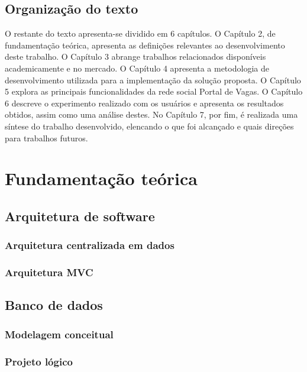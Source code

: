 \documentclass[cic,tc]{iiufrgs}
\begin{document}
\section{Organização do texto}
\label{introducaoOrganizacao}
O restante do texto apresenta-se dividido em 6 capítulos. O Capítulo 2, de fundamentação teórica, apresenta as definições relevantes ao desenvolvimento deste trabalho. O Capítulo 3 abrange trabalhos relacionados disponíveis academicamente e no mercado. O Capítulo 4 apresenta a metodologia de desenvolvimento utilizada para a implementação da solução proposta. O Capítulo 5 explora as principais funcionalidades da rede social Portal de Vagas. O Capítulo 6 descreve o experimento realizado com os usuários e apresenta os resultados obtidos, assim como uma análise destes. No Capítulo 7, por fim, é realizada uma síntese do trabalho desenvolvido, elencando o que foi alcançado e quais direções para trabalhos futuros.

\chapter{Fundamentação teórica}

\section{Arquitetura de software}
\label{fundArquietura}

\subsection{Arquitetura centralizada em dados}
\label{fundArqCentralizada}
\subsection{Arquitetura MVC}
\label{fundArqMVC}

\section{Banco de dados}
\label{fundBD}

\subsection{Modelagem conceitual}
\label{fundBDModelagem}
\subsection{Projeto lógico}
\label{fundBDProjeto}
\end{document}
